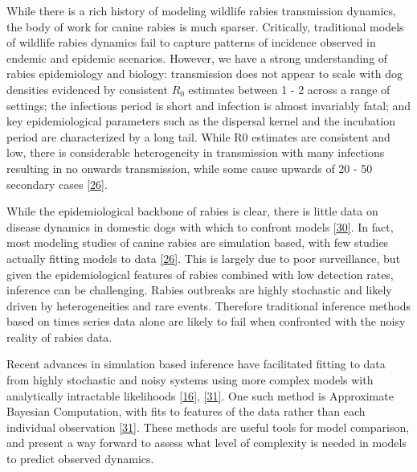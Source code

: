 \documentclass[
  oneside]{book}
\begin{document}
While there is a rich history of modeling wildlife rabies transmission dynamics, the body of work for canine rabies is much sparser. Critically, traditional models of wildlife rabies dynamics fail to capture patterns of incidence observed in endemic and epidemic scenarios. However, we have a strong understanding of rabies epidemiology and biology: transmission does not appear to scale with dog densities evidenced by consistent \(R_{0}\) estimates between 1 - 2 across a range of settings; the infectious period is short and infection is almost invariably fatal; and key epidemiological parameters such as the dispersal kernel and the incubation period are characterized by a long tail. While R0 estimates are consistent and low, there is considerable heterogeneity in transmission with many infections resulting in no onwards transmission, while some cause upwards of 20 - 50 secondary cases \protect\hyperlink{ref-rajeev2020modeling}{{[}26{]}}.

While the epidemiological backbone of rabies is clear, there is little data on disease dynamics in domestic dogs with which to confront models \protect\hyperlink{ref-scott2017}{{[}30{]}}. In fact, most modeling studies of canine rabies are simulation based, with few studies actually fitting models to data \protect\hyperlink{ref-rajeev2020modeling}{{[}26{]}}. This is largely due to poor surveillance, but given the epidemiological features of rabies combined with low detection rates, inference can be challenging. Rabies outbreaks are highly stochastic and likely driven by heterogeneities and rare events. Therefore traditional inference methods based on times series data alone are likely to fail when confronted with the noisy reality of rabies data.

Recent advances in simulation based inference have facilitated fitting to data from highly stochastic and noisy systems using more complex models with analytically intractable likelihoods \protect\hyperlink{ref-funk2020}{{[}16{]}}, \protect\hyperlink{ref-hazelbag2020}{{[}31{]}}. One such method is Approximate Bayesian Computation, with fits to features of the data rather than each individual observation \protect\hyperlink{ref-hazelbag2020}{{[}31{]}}. These methods are useful tools for model comparison, and present a way forward to assess what level of complexity is needed in models to predict observed dynamics.
\end{document}
